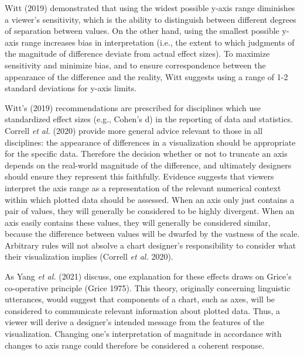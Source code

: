 \documentclass[
]{interact}
\begin{document}
Witt (2019) demonstrated that using the widest possible y-axis range
diminishes a viewer's sensitivity, which is the ability to distinguish
between different degrees of separation between values. On the other
hand, using the smallest possible y-axis range increases bias in
interpretation (i.e., the extent to which judgments of the magnitude of
difference deviate from actual effect sizes). To maximize sensitivity
and minimize bias, and to ensure correspondence between the appearance
of the difference and the reality, Witt suggests using a range of 1-2
standard deviations for y-axis limits.

Witt's (2019) recommendations are prescribed for disciplines which use
standardized effect sizes (e.g., Cohen's d) in the reporting of data and
statistics. Correll \emph{et al.} (2020) provide more general advice
relevant to those in all disciplines: the appearance of differences in a
visualization should be appropriate for the specific data. Therefore the
decision whether or not to truncate an axis depends on the real-world
magnitude of the difference, and ultimately designers should ensure they
represent this faithfully. Evidence suggests that viewers interpret the
axis range as a representation of the relevant numerical context within
which plotted data should be assessed. When an axis only just contains a
pair of values, they will generally be considered to be highly
divergent. When an axis easily contains these values, they will
generally be considered similar, because the difference between values
will be dwarfed by the vastness of the scale. Arbitrary rules will not
absolve a chart designer's responsibility to consider what their
visualization implies (Correll \emph{et al.} 2020).

As Yang \emph{et al.} (2021) discuss, one explanation for these effects
draws on Grice's co-operative principle (Grice 1975). This theory,
originally concerning linguistic utterances, would suggest that
components of a chart, such as axes, will be considered to communicate
relevant information about plotted data. Thus, a viewer will derive a
designer's intended message from the features of the visualization.
Changing one's interpretation of magnitude in accordance with changes to
axis range could therefore be considered a coherent response.
\end{document}
